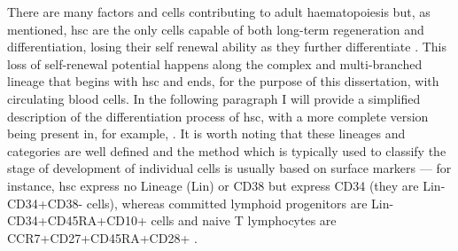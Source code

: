 There are many factors and cells contributing to adult haematopoiesis but, as mentioned, \ac{hsc} are the only cells capable of both long-term regeneration and differentiation, losing their self renewal ability as they further differentiate \cite{Rieger2012-bh,Benveniste2010-au}. This loss of self-renewal potential happens along the complex and multi-branched lineage that begins with \ac{hsc} and ends, for the purpose of this dissertation, with circulating blood cells. In the following paragraph I will provide a simplified description of the differentiation process of \ac{hsc}, with a more complete version being present in, for example, \cite{Rieger2012-bh}. It is worth noting that these lineages and categories are well defined and the method which is typically used to classify the stage of development of individual cells is usually based on surface markers \cite{Spangrude1988-xs,Ng2017-cp} --- for instance, \ac{hsc} express no Lineage (Lin) or CD38 but express CD34 (they are Lin-CD34+CD38- cells), whereas committed lymphoid progenitors are Lin-CD34+CD45RA+CD10+ cells and naive T lymphocytes are CCR7+CD27+CD45RA+CD28+ \cite{Miller1999-en,Appay2008-sk}.

